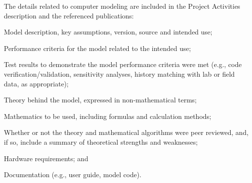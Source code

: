 \documentclass[12pt]{article}
\begin{document}
The details related to computer modeling are included in the Project Activities description and the referenced publications:
\begin{compactitem}
\item Model description, key assumptions, version, source and intended use;
\item Performance criteria for the model related to the intended use;
\item Test results to demonstrate the model performance criteria were met (e.g., code
verification/validation, sensitivity analyses, history matching with lab or field data, as
appropriate);
\item Theory behind the model, expressed in non‐mathematical terms;
\item Mathematics to be used, including formulas and calculation methods;
\item Whether or not the theory and mathematical algorithms were peer reviewed, and, if so,
include a summary of theoretical strengths and weaknesses;
\item Hardware requirements; and
\item Documentation (e.g., user guide, model code).
\end{compactitem}





\appendix

\makeatletter
\def\@seccntformat#1{APPENDIX \csname the#1\endcsname.~}
\makeatother

%
%
%
\end{document}
